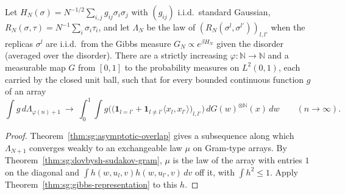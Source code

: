 \begin{theorem}\label{thm:sg:asymptotic-gibbs-measure}
  \leanok
Let $H_N(\sigma)=N^{-1/2}\sum_{i,j}g_{ij}\sigma_i\sigma_j$ with $(g_{ij})$ i.i.d.\ standard Gaussian, $R_N(\sigma,\tau)=N^{-1}\sum_i\sigma_i\tau_i$, and let $\Lambda_N$ be the law of $(R_N(\sigma^l,\sigma^{l'}))_{l,l'}$ when the replicas $\sigma^l$ are i.i.d.\ from the Gibbs measure $G_N\propto e^{\beta H_N}$ given the disorder (averaged over the disorder). There are a strictly increasing $\varphi:\mathbb N\to\mathbb N$ and a measurable map $G$ from $[0,1]$ to the probability measures on $L^2(0,1)$, each carried by the closed unit ball, such that for every bounded continuous function $g$ of an array
\[\int g\,d\Lambda_{\varphi(n)+1}\ \longrightarrow\ \int_0^1\!\!\int g\Big(\big(\mathbf 1_{l=l'}+\mathbf 1_{l\ne l'}\langle x_l,x_{l'}\rangle\big)_{l,l'}\Big)\,dG(w)^{\otimes\mathbb N}(x)\,dw\qquad(n\to\infty).\]
\end{theorem}

\begin{proof}
  \leanok
{}
Theorem~\ref{thm:sg:asymptotic-overlap} gives a subsequence along which $\Lambda_{N+1}$ converges weakly to an exchangeable law $\mu$ on Gram-type arrays. By Theorem~\ref{thm:sg:dovbysh-sudakov-gram}, $\mu$ is the law of the array with entries $1$ on the diagonal and $\int h(w,u_l,v)h(w,u_{l'},v)\,dv$ off it, with $\int h^2\le1$. Apply Theorem~\ref{thm:sg:gibbs-representation} to this $h$.
\end{proof}

